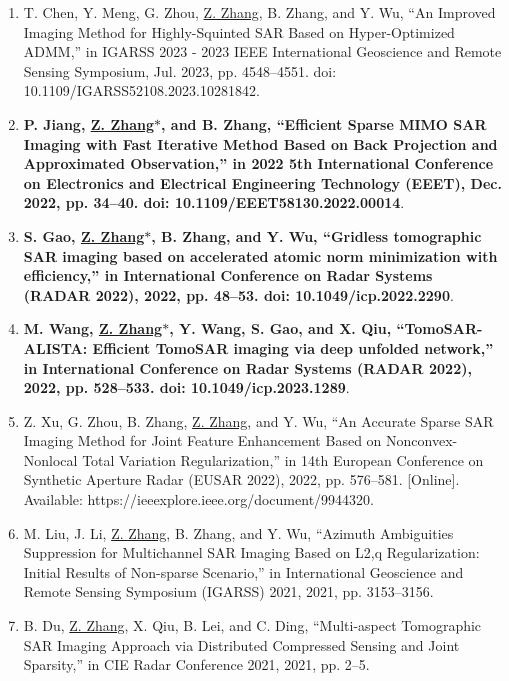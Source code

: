 \documentclass[paper=a4,fontsize=11pt]{scrartcl}
\begin{document}
\begin{enumerate}
	\item T. Chen, Y. Meng, G. Zhou, \underline{Z. Zhang}, B. Zhang, and Y. Wu, ``An Improved Imaging Method for Highly-Squinted SAR Based on Hyper-Optimized ADMM,'' in IGARSS 2023 - 2023 IEEE International Geoscience and Remote Sensing Symposium, Jul. 2023, pp. 4548–4551. doi: 10.1109/IGARSS52108.2023.10281842.
	
	\item \textbf{P. Jiang, \underline{Z. Zhang$\ast$}, and B. Zhang, ``Efficient Sparse MIMO SAR Imaging with Fast Iterative Method Based on Back Projection and Approximated Observation,'' in 2022 5th International Conference on Electronics and Electrical Engineering Technology (EEET), Dec. 2022, pp. 34–40. doi: 10.1109/EEET58130.2022.00014}.
	
	\item \textbf{S. Gao, \underline{Z. Zhang$\ast$}, B. Zhang, and Y. Wu, ``Gridless tomographic SAR imaging based on accelerated atomic norm minimization with efficiency,'' in International Conference on Radar Systems (RADAR 2022), 2022, pp. 48–53. doi: 10.1049/icp.2022.2290}.
	
	\item \textbf{M. Wang, \underline{Z. Zhang$\ast$}, Y. Wang, S. Gao, and X. Qiu, ``TomoSAR-ALISTA: Efficient TomoSAR imaging via deep unfolded network,'' in International Conference on Radar Systems (RADAR 2022), 2022, pp. 528–533. doi: 10.1049/icp.2023.1289}.
	
	\item Z. Xu, G. Zhou, B. Zhang, \underline{Z. Zhang}, and Y. Wu, ``An Accurate Sparse SAR Imaging Method for Joint Feature Enhancement Based on Nonconvex-Nonlocal Total Variation Regularization,'' in 14th European Conference on Synthetic Aperture Radar (EUSAR 2022), 2022, pp. 576–581. [Online]. Available: https://ieeexplore.ieee.org/document/9944320.
	
	\item M. Liu, J. Li, \underline{Z. Zhang}, B. Zhang, and Y. Wu, ``Azimuth Ambiguities Suppression for Multichannel SAR Imaging Based on L2,q Regularization: Initial Results of Non-sparse Scenario,'' in International Geoscience and Remote Sensing Symposium (IGARSS) 2021, 2021, pp. 3153–3156.
	
	\item B. Du, \underline{Z. Zhang}, X. Qiu, B. Lei, and C. Ding, ``Multi-aspect Tomographic SAR Imaging Approach via Distributed Compressed Sensing and Joint Sparsity,'' in CIE Radar Conference 2021, 2021, pp. 2–5.
	

\end{enumerate}
\end{document}
